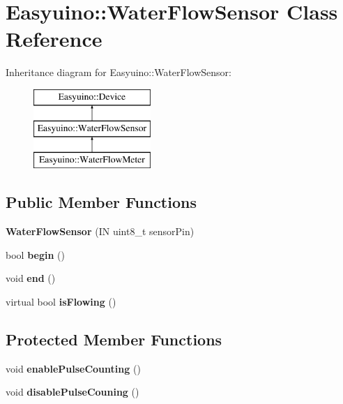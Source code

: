 \hypertarget{class_easyuino_1_1_water_flow_sensor}{}\section{Easyuino\+:\+:Water\+Flow\+Sensor Class Reference}
\label{class_easyuino_1_1_water_flow_sensor}
Inheritance diagram for Easyuino\+:\+:Water\+Flow\+Sensor\+:\begin{figure}[H]
\begin{center}
\leavevmode
\includegraphics[height=3.000000cm]{class_easyuino_1_1_water_flow_sensor}
\end{center}
\end{figure}
\subsection*{Public Member Functions}
\begin{DoxyCompactItemize}
\item 
\mbox{\label{class_easyuino_1_1_water_flow_sensor_acee82d1863cb2311e58210906d9fbfaa}} 
{\bfseries Water\+Flow\+Sensor} (IN uint8\+\_\+t sensor\+Pin)
\item 
\mbox{\label{class_easyuino_1_1_water_flow_sensor_a55dcab6c527b1e1951a1fff69efdb763}} 
bool {\bfseries begin} ()
\item 
\mbox{\label{class_easyuino_1_1_water_flow_sensor_a7f31ac7735b049394d34cfbc37f17359}} 
void {\bfseries end} ()
\item 
\mbox{\label{class_easyuino_1_1_water_flow_sensor_a32606f6faa0d5e3b91628a6c43869686}} 
virtual bool {\bfseries is\+Flowing} ()
\end{DoxyCompactItemize}
\subsection*{Protected Member Functions}
\begin{DoxyCompactItemize}
\item 
\mbox{\label{class_easyuino_1_1_water_flow_sensor_adc2ba2c1888114b01719cfd6a659d59b}} 
void {\bfseries enable\+Pulse\+Counting} ()
\item 
\mbox{\label{class_easyuino_1_1_water_flow_sensor_a66d275227c18329b38f33834b4682ff3}} 
void {\bfseries disable\+Pulse\+Couning} ()
\end{DoxyCompactItemize}
